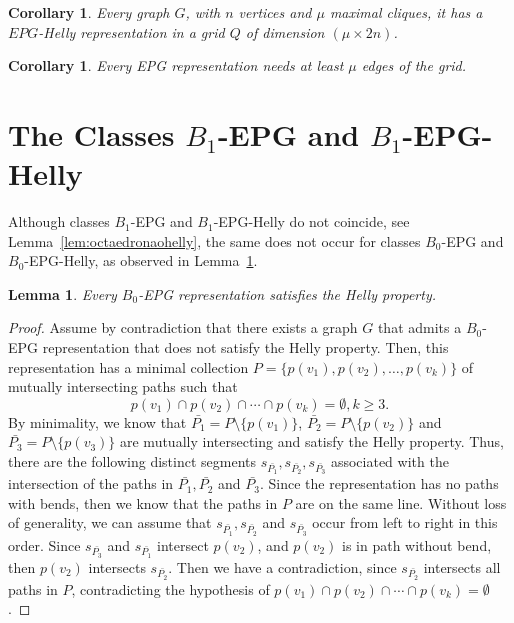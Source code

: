 \documentclass[a4paper,11pt]{article}
\newtheorem{lema}[theorem]{Lemma}
\newtheorem{coro}[theorem]{Corollary}
\begin{document}
 \begin{coro}
 Every graph $G$, with $n$ vertices and $\mu$ maximal cliques, it has a $EPG$-Helly representation in a grid $Q$ of dimension $(\mu \times 2n)$.
 \end{coro}
 
  \begin{coro}
 Every EPG representation needs at least $\mu$ edges of the grid.
 \end{coro}
 
 
\section{The Classes $B_1$-EPG and $B_1$-EPG-Helly}

Although classes $B_1$-EPG and $ B_1$-EPG-Helly do not coincide, see Lemma~\ref{lem:octaedronaohelly}, the same does not occur for classes $ B_0$-EPG and $ B_0$-EPG-Helly, as observed in Lemma~\ref{lem:b0epg}.

\begin {lema} \label{lem:b0epg}
Every $ B_0$-EPG representation satisfies the Helly property.
\end {lema}
\begin {proof}
Assume by contradiction that there exists a graph $G$ that admits a $ B_0$-EPG representation that does not satisfy the Helly property. Then, this representation has a minimal collection $ P = \{p (v_1), p (v_2), \ldots, p (v_k) \} $ of mutually intersecting paths such that $$ p(v_1) \cap p(v_2 ) \cap \cdots \cap p(v_k) = \emptyset, k \geq 3. $$
By minimality, we know that $ \bar{P_1} = P \setminus \{p (v_1) \}$, $ \bar {P_2} = P \setminus \{p(v_2) \} $ and $ \bar {P_3 } = P \setminus \{p (v_3) \} $ are mutually intersecting and satisfy the Helly property.
Thus, there are the following distinct segments $ s_{\bar{P_1}}, s_{\bar {P_2}}, s_{\bar {P_3}}$ associated with the intersection of the paths in $ \bar {P_1},  \bar {P_2} $ and $ \bar {P_3} $. Since the representation has no paths with bends, then we know that the paths in $ P$ are on the same line.
Without loss of generality, we can assume that $ s_{ \bar {P_1}}, s_{ \bar {P_2}}$ and $ s_{ \bar {P_3}}$ occur from left to right in this order.
Since $ s_{\bar {P_3}}$ and $ s_{\bar {P_1}}$ intersect $ p(v_2) $, and $ p (v_2) $ is in path without bend, then $ p (v_2) $ intersects $ s_{\bar {P_2}}$. Then we have a contradiction, since $ s_{\bar {P_2}} $ intersects all paths in $ P $, contradicting the hypothesis of $ p(v_1) \cap p(v_2) \cap \cdots \cap p(v_k) = \emptyset $.
\end {proof}
\end{document}
